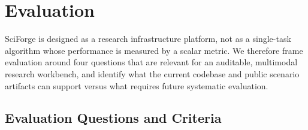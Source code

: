 \documentclass[sn-basic,Numbered,pdflatex]{sn-jnl}
\begin{document}
\section{Evaluation}

SciForge is designed as a research infrastructure platform, not as a single-task algorithm whose performance is measured by a scalar metric. We therefore frame evaluation around four questions that are relevant for an auditable, multimodal research workbench, and identify what the current codebase and public scenario artifacts can support versus what requires future systematic evaluation.

\subsection{Evaluation Questions and Criteria}
\end{document}
